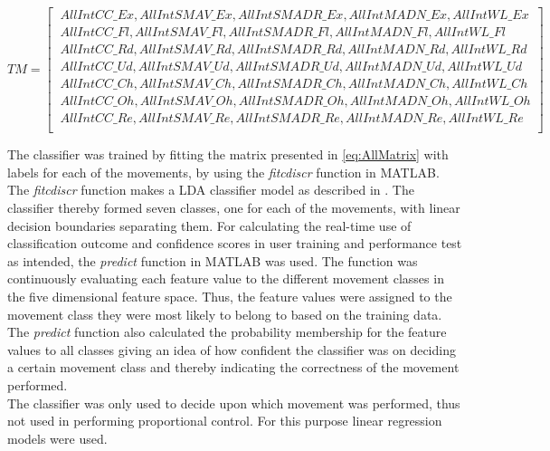 \begin{footnotesize}
 \begin{equation} \label{eq:AllMatrix}
TM=\begin{bmatrix} 
\ AllIntCC\_Ex, AllIntSMAV\_Ex, AllIntSMADR\_Ex, AllIntMADN\_Ex, AllIntWL\_Ex \\
\ AllIntCC\_Fl, AllIntSMAV\_Fl, AllIntSMADR\_Fl, AllIntMADN\_Fl, AllIntWL\_Fl \\
\ AllIntCC\_Rd, AllIntSMAV\_Rd, AllIntSMADR\_Rd, AllIntMADN\_Rd, AllIntWL\_Rd \\
\ AllIntCC\_Ud, AllIntSMAV\_Ud, AllIntSMADR\_Ud, AllIntMADN\_Ud, AllIntWL\_Ud \\
\ AllIntCC\_Ch, AllIntSMAV\_Ch, AllIntSMADR\_Ch, AllIntMADN\_Ch, AllIntWL\_Ch \\
\ AllIntCC\_Oh, AllIntSMAV\_Oh, AllIntSMADR\_Oh, AllIntMADN\_Oh, AllIntWL\_Oh \\
\ AllIntCC\_Re, AllIntSMAV\_Re, AllIntSMADR\_Re, AllIntMADN\_Re, AllIntWL\_Re \\
\end{bmatrix}
\end{equation}
\end{footnotesize}

The classifier was trained by fitting the matrix presented in \eqref{eq:AllMatrix} with labels for each of the movements, by using the \textit{fitcdiscr} function in MATLAB. %
The \textit{fitcdiscr} function makes a LDA classifier model as described in .
The classifier thereby formed seven classes, one for each of the movements, with linear decision boundaries separating them. For calculating the real-time use of classification outcome and confidence scores in user training and performance test as intended, the \textit{predict} function in MATLAB was used. The function was continuously evaluating each feature value to the different movement classes in the five dimensional feature space. Thus, the feature values were assigned to the movement class they were most likely to belong to based on the training data. The \textit{predict} function also calculated the probability membership for the feature values to all classes giving an idea of how confident the classifier was on deciding a certain movement class and thereby indicating the correctness of the movement performed. \\ 
The classifier was only used to decide upon which movement was performed, thus not used in performing proportional control. For this purpose linear regression models were used. 


